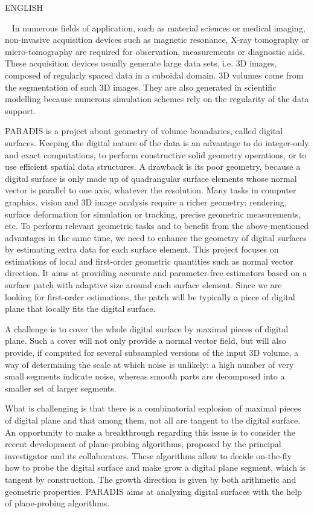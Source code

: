 \documentclass[french]{article}
\begin{document}
ENGLISH

~
In numerous fields of application, such as material sciences
or medical imaging, non-invasive acquisition devices such as magnetic
resonance, X-ray tomography or micro-tomography are required for
observation, measurements or diagnostic aids.
These acquisition devices usually generate large data sets, i.e.
3D images, composed of regularly spaced data in a cuboidal domain.
3D volumes come from the segmentation of such 3D images.
They are also generated in scientific modelling because
numerous simulation schemes rely on the regularity of the data support.

PARADIS is a project about geometry of volume boundaries,
called digital surfaces. 
Keeping the digital nature of the data is an advantage
to do integer-only and exact computations,
to perform constructive solid geometry operations,
or to use efficient spatial data structures.
A drawback is its poor geometry, because a digital surface is only 
made up of quadrangular surface elements whose normal vector is parallel to one axis, 
whatever the resolution.  
Many tasks in computer graphics, vision and 3D image analysis require a richer geometry: 
rendering, surface deformation for simulation or tracking, precise geometric measurements, etc.
To perform relevant geometric tasks and 
to benefit from the above-mentioned advantages in the same time, 
we need to enhance the geometry of digital surfaces by estimating extra data for each surface element. 
This project focuses on estimations of local and first-order geometric quantities
such as normal vector direction.
It aims at providing accurate and parameter-free estimators
based on a surface patch with adaptive size around each surface element.
Since we are looking for first-order estimations, the patch will be typically a piece of digital plane
that locally fits the digital surface.

A challenge is to cover the whole digital surface by maximal pieces of digital plane. 
Such a cover will not only provide a normal vector field, but will also provide, if computed
for several subsampled versions of the input 3D volume, a way of determining the scale 
at which noise is unlikely: a high number of very small segments indicate noise, whereas
smooth parts are decomposed into a smaller set of larger segments.    

What is challenging is that there is a combinatorial explosion
of maximal pieces of digital plane and that among them,
not all are tangent to the digital surface.  
An opportunity to make a breakthrough regarding this issue is to consider the recent development
of plane-probing algorithms, proposed by the principal investigator and its collaborators.
These algorithms allow to decide
on-the-fly how to probe the digital surface and make grow a digital plane segment,
which is tangent by construction. The growth direction is given by both arithmetic and geometric properties.
PARADIS aims at analyzing digital surfaces with the help of plane-probing algorithms. 
\end{document}
